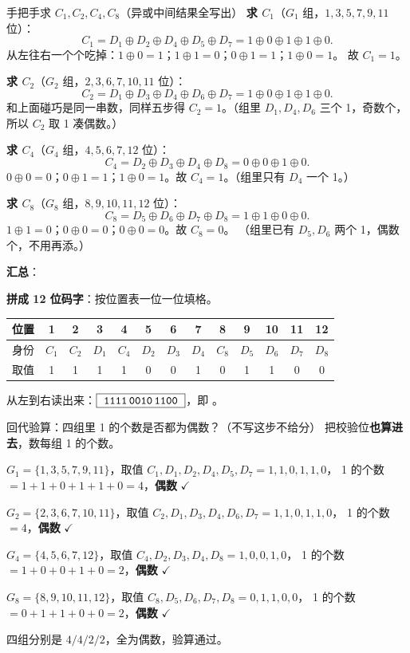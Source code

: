 \begin{calc}{手把手求 $C_1,C_2,C_4,C_8$（异或中间结果全写出）}
\textbf{求 $C_1$}（$G_1$ 组，$1,3,5,7,9,11$ 位）：
\[
C_1=D_1\oplus D_2\oplus D_4\oplus D_5\oplus D_7=1\oplus0\oplus1\oplus1\oplus0 .
\]
从左往右一个个吃掉：$1\oplus0=1$；$1\oplus1=0$；$0\oplus1=1$；$1\oplus0=1$。
故 $C_1=1$。

\textbf{求 $C_2$}（$G_2$ 组，$2,3,6,7,10,11$ 位）：
\[
C_2=D_1\oplus D_3\oplus D_4\oplus D_6\oplus D_7=1\oplus0\oplus1\oplus1\oplus0 .
\]
和上面碰巧是同一串数，同样五步得 $C_2=1$。（组里 $D_1,D_4,D_6$ 三个 1，奇数个，
所以 $C_2$ 取 1 凑偶数。）

\textbf{求 $C_4$}（$G_4$ 组，$4,5,6,7,12$ 位）：
\[
C_4=D_2\oplus D_3\oplus D_4\oplus D_8=0\oplus0\oplus1\oplus0 .
\]
$0\oplus0=0$；$0\oplus1=1$；$1\oplus0=1$。故 $C_4=1$。（组里只有 $D_4$ 一个 1。）

\textbf{求 $C_8$}（$G_8$ 组，$8,9,10,11,12$ 位）：
\[
C_8=D_5\oplus D_6\oplus D_7\oplus D_8=1\oplus1\oplus0\oplus0 .
\]
$1\oplus1=0$；$0\oplus0=0$；$0\oplus0=0$。故 $C_8=0$。
（组里已有 $D_5,D_6$ 两个 1，偶数个，不用再添。）

\textbf{汇总}：\quad{}\quad{}\quad{}
\end{calc}

\textbf{拼成 12 位码字}：按位置表一位一位填格。

\begin{center}\small
\setlength{\tabcolsep}{4pt}
\begin{tabular}{@{}l*{12}{c}@{}}
\toprule
位置 & 1&2&3&4&5&6&7&8&9&10&11&12\\
\midrule
身份 & $C_1$&$C_2$&$D_1$&$C_4$&$D_2$&$D_3$&$D_4$&$C_8$&$D_5$&$D_6$&$D_7$&$D_8$\\
取值 & 1&1&1&1&0&0&1&0&1&1&0&0\\
\bottomrule
\end{tabular}
\end{center}

从左到右读出来：$\boxed{\ \texttt{1111\,0010\,1100}\ }$，即 。

\begin{calc}{回代验算：四组里 1 的个数是否都为偶数？（不写这步不给分）}
把校验位\textbf{也算进去}，数每组 1 的个数。

$G_1=\{1,3,5,7,9,11\}$，取值 $C_1,D_1,D_2,D_4,D_5,D_7=1,1,0,1,1,0$，
1 的个数 $=1+1+0+1+1+0=4$，\textbf{偶数} $\checkmark$

$G_2=\{2,3,6,7,10,11\}$，取值 $C_2,D_1,D_3,D_4,D_6,D_7=1,1,0,1,1,0$，
1 的个数 $=4$，\textbf{偶数} $\checkmark$

$G_4=\{4,5,6,7,12\}$，取值 $C_4,D_2,D_3,D_4,D_8=1,0,0,1,0$，
1 的个数 $=1+0+0+1+0=2$，\textbf{偶数} $\checkmark$

$G_8=\{8,9,10,11,12\}$，取值 $C_8,D_5,D_6,D_7,D_8=0,1,1,0,0$，
1 的个数 $=0+1+1+0+0=2$，\textbf{偶数} $\checkmark$

四组分别是 $4/4/2/2$，全为偶数，验算通过。
\end{calc}

